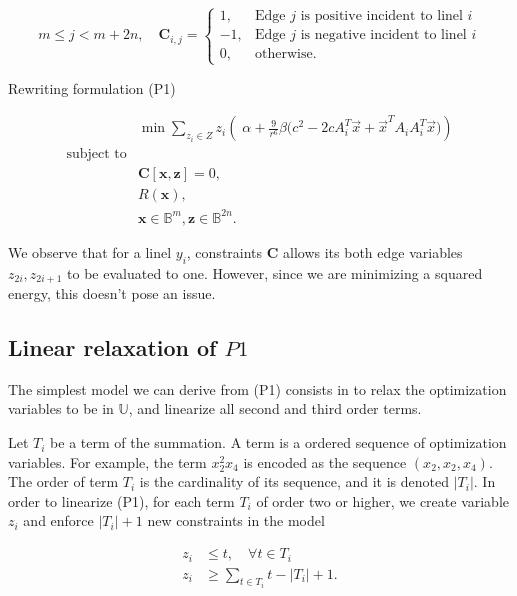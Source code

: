 \[
	m \leq j < m + 2n, \quad \mathbf{C}_{i,j} = \left\{ \begin{array}{ll}
	
	1,& \text{Edge $j$ is positive incident to linel $i$}\\
	-1,& \text{Edge $j$ is negative incident to linel $i$}\\	
	0,& \text{otherwise}.
	\end{array}\right.
\]

Rewriting formulation (P1)

\[
\begin{array}{ll}
& \displaystyle	\min \sum_{z_i \in Z}{ z_i \left(\; \alpha + \frac{9}{r^6}\beta \big(c^2 - 2cA_i^T\vec{x} + \vec{x}^TA_iA_i^T\vec{x}\big)\right)} \\
\text{subject to}\\
&	\mathbf{C}[ \mathbf{x}, \mathbf{z}] = 0,\\
&   R(\mathbf{x}),\\
&   \mathbf{x} \in \mathbb{B}^{m}, \mathbf{z} \in \mathbb{B}^{2n}.
\end{array}
\]


We observe that for a linel $y_i$, constraints $\mathbf{C}$ allows its both edge variables $z_{2i},z_{2i+1}$ to be evaluated to one. However, since we are minimizing a squared energy, this doesn't pose an issue.




\subsection{Linear relaxation of $P1$}

	The simplest model we can derive from (P1) consists in to relax the optimization variables to be in $\mathbb{U}$, and linearize all second and third order terms. 
	
	Let $T_i$ be a term of the summation. A term is a ordered sequence of optimization variables. For example, the term $x_2^2x_4$ is encoded as the sequence $(x_2,x_2,x_4)$. The order of term $T_i$ is the cardinality of its sequence, and it is denoted $|T_i|$. In order to linearize (P1), for each term $T_i$ of order two or higher, we create variable $z_i$ and enforce $|T_i|+1$ new constraints in the model
	
	\begin{align*}
		z_i &\leq t, \quad \forall t \in T_i \\
		z_i &\geq \sum_{t \in T_i}{t} - |T_i| + 1.		
	\end{align*}

